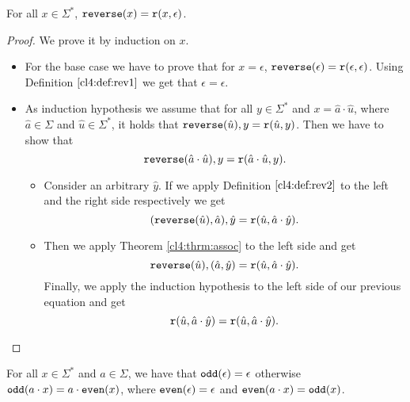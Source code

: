 \begin{theorem}
For all $x \in \Sigma^*$, $\mathtt{reverse}(x) = \mathtt{r}(x, \epsilon)$.
\end{theorem}
\begin{proof} We prove it by induction on $x$.
    \begin{itemize}
        \item For the base case we have to prove that for $x=\epsilon$, $\mathtt{reverse}(\epsilon) =\mathtt{r}(\epsilon, \epsilon)$. Using Definition $\ref{cl4:def:rev1}$ we get that $\epsilon=\epsilon$.
        \item As induction hypothesis we assume that for all $y \in \Sigma^*$ and $x = \hat{a}\cdot \hat{u}$, where $\hat{a} \in \Sigma$ and $\hat{u}\in\Sigma^*$, it holds that $\mathtt{reverse}(\hat{u}), y = \mathtt{r}(\hat{u}, y)$. Then we have to show that 
        \begin{equation}
            \mathtt{reverse}(\hat{a}\cdot \hat{u}), y = \mathtt{r}(\hat{a}\cdot\hat{u}, y).
            \label{eq:rev_ind}
        \end{equation}
        \begin{itemize}
            \item Consider an arbitrary $\hat{y}$. If we apply Definition $\ref{cl4:def:rev2}$ to the left and the right side respectively we get
            \begin{equation}
                (\mathtt{reverse}(\hat{u}), \hat{a}),\hat{y} = \mathtt{r}(\hat{u}, \hat{a}\cdot \hat{y}).
            \end{equation}
            \item Then we apply Theorem \ref{cl4:thrm:assoc} to the left side and get
            \begin{equation}
                \mathtt{reverse}(\hat{u}), (\hat{a}, \hat{y})= \mathtt{r}(\hat{u}, \hat{a}\cdot \hat{y}).
            \end{equation}
            Finally, we apply the induction hypothesis to the left side of our previous equation and get
            \begin{equation}
                \mathtt{r}(\hat{u}, \hat{a}\cdot \hat{y}) = \mathtt{r}(\hat{u}, \hat{a}\cdot \hat{y}).
            \end{equation}
        \end{itemize}
    \end{itemize}
    
\end{proof}
\begin{definition} For all $x \in \Sigma^*$ and $a \in \Sigma$, we have that $\mathtt{odd}(\epsilon) = \epsilon$ otherwise $\mathtt{odd}(a\cdot x) = a\cdot \mathtt{even}(x)$, where $\mathtt{even}(\epsilon) = \epsilon$ and $\mathtt{even}(a\cdot x) = \mathtt{odd}(x)$.
\end{definition}

